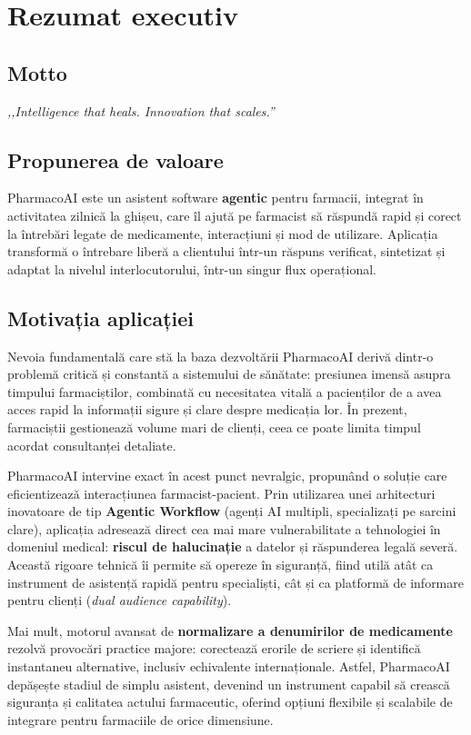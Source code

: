 \section{Rezumat executiv}

\subsection*{Motto}
\textit{,,Intelligence that heals. Innovation that scales.''}

\subsection*{Propunerea de valoare}
PharmacoAI este un asistent software \textbf{agentic} pentru farmacii, integrat în activitatea zilnică la ghișeu, care îl ajută pe farmacist să răspundă rapid și corect la întrebări legate de medicamente, interacțiuni și mod de utilizare. Aplicația transformă o întrebare liberă a clientului într-un răspuns verificat, sintetizat și adaptat la nivelul interlocutorului, într-un singur flux operațional.

\subsection*{Motivația aplicației}
Nevoia fundamentală care stă la baza dezvoltării PharmacoAI derivă dintr-o problemă critică și constantă a sistemului de sănătate: presiunea imensă asupra timpului farmaciștilor, combinată cu necesitatea vitală a pacienților de a avea acces rapid la informații sigure și clare despre medicația lor. În prezent, farmaciștii gestionează volume mari de clienți, ceea ce poate limita timpul acordat consultanței detaliate.

PharmacoAI intervine exact în acest punct nevralgic, propunând o soluție care eficientizează interacțiunea farmacist-pacient. Prin utilizarea unei arhitecturi inovatoare de tip \textbf{Agentic Workflow} (agenți AI multipli, specializați pe sarcini clare), aplicația adresează direct cea mai mare vulnerabilitate a tehnologiei în domeniul medical: \textbf{riscul de halucinație} a datelor și răspunderea legală severă. Această rigoare tehnică îi permite să opereze în siguranță, fiind utilă atât ca instrument de asistență rapidă pentru specialiști, cât și ca platformă de informare pentru clienți (\textit{dual audience capability}).

Mai mult, motorul avansat de \textbf{normalizare a denumirilor de medicamente} rezolvă provocări practice majore: corectează erorile de scriere și identifică instantaneu alternative, inclusiv echivalente internaționale. Astfel, PharmacoAI depășește stadiul de simplu asistent, devenind un instrument capabil să crească siguranța și calitatea actului farmaceutic, oferind opțiuni flexibile și scalabile de integrare pentru farmaciile de orice dimensiune.

